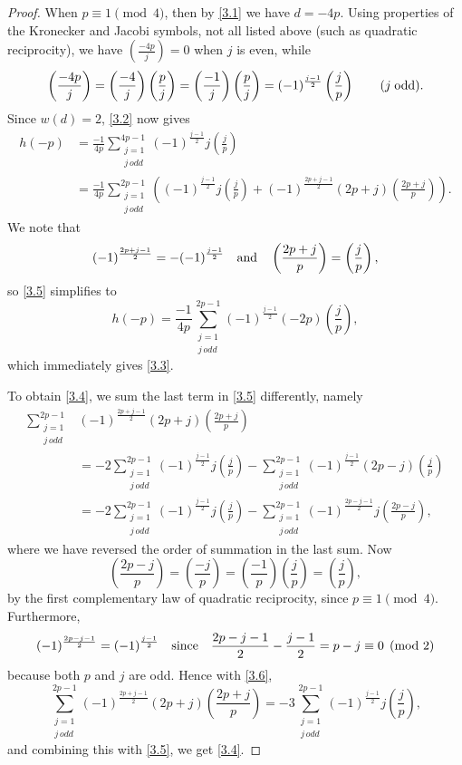 \documentclass{amsart}
\theoremstyle{plain}
\numberwithin{equation}{section}
\begin{document}
\begin{proof}
When $p\equiv 1\pmod{4}$, then by \eqref{3.1} we have $d=-4p$. Using 
properties of the Kronecker and Jacobi symbols, not all listed above (such as
quadratic reciprocity), we have $(\frac{-4p}{j})=0$ when $j$ is even, while
\[
\left(\frac{-4p}{j}\right)=\left(\frac{-4}{j}\right)\left(\frac{p}{j}\right)
=\left(\frac{-1}{j}\right)\left(\frac{p}{j}\right)
=(-1)^{\frac{j-1}{2}}\left(\frac{j}{p}\right)\qquad (j\;\hbox{odd}).
\]
Since $w(d)=2$, \eqref{3.2} now gives
\begin{align}
h(-p)&=\frac{-1}{4p}\sum_{\substack{j=1\\j\,odd}}^{4p-1}
(-1)^{\frac{j-1}{2}}j\left(\frac{j}{p}\right)\label{3.5} \\
&=\frac{-1}{4p}\sum_{\substack{j=1\\j\,odd}}^{2p-1}
\left((-1)^{\frac{j-1}{2}}j\left(\frac{j}{p}\right)
+(-1)^{\frac{2p+j-1}{2}}(2p+j)\left(\frac{2p+j}{p}\right)\right).\nonumber
\end{align}
We note that
\[
(-1)^{\frac{2p+j-1}{2}} = - (-1)^{\frac{j-1}{2}}\quad\hbox{and}\quad
\left(\frac{2p+j}{p}\right) = \left(\frac{j}{p}\right),
\]
so \eqref{3.5} simplifies to
\[
h(-p)=\frac{-1}{4p}\sum_{\substack{j=1\\j\,odd}}^{2p-1}
(-1)^{\frac{j-1}{2}}(-2p)\left(\frac{j}{p}\right),
\]
which immediately gives \eqref{3.3}.

To obtain \eqref{3.4}, we sum the last term in \eqref{3.5} differently, namely
\begin{align}
\sum_{\substack{j=1\\j\,odd}}^{2p-1}
&(-1)^{\frac{2p+j-1}{2}}(2p+j)\left(\frac{2p+j}{p}\right)\label{3.6}\\
&=-2\sum_{\substack{j=1\\j\,odd}}^{2p-1}
(-1)^{\frac{j-1}{2}}j\left(\frac{j}{p}\right)
-\sum_{\substack{j=1\\j\,odd}}^{2p-1}
(-1)^{\frac{j-1}{2}}(2p-j)\left(\frac{j}{p}\right) \nonumber\\
&=-2\sum_{\substack{j=1\\j\,odd}}^{2p-1}
(-1)^{\frac{j-1}{2}}j\left(\frac{j}{p}\right)
-\sum_{\substack{j=1\\j\,odd}}^{2p-1}
(-1)^{\frac{2p-j-1}{2}}j\left(\frac{2p-j}{p}\right),\nonumber
\end{align}
where we have reversed the order of summation in the last sum. Now
\[
\left(\frac{2p-j}{p}\right) = \left(\frac{-j}{p}\right)
= \left(\frac{-1}{p}\right)\left(\frac{j}{p}\right)
= \left(\frac{j}{p}\right),
\]
by the first complementary law of quadratic reciprocity, since 
$p\equiv 1\pmod{4}$. Furthermore,
\[
(-1)^{\frac{2p-j-1}{2}} = (-1)^{\frac{j-1}{2}}\quad\hbox{since}\quad
\frac{2p-j-1}{2}-\frac{j-1}{2}=p-j\equiv 0\pmod{2}
\]
because both $p$ and $j$ are odd. Hence with \eqref{3.6},
\[
\sum_{\substack{j=1\\j\,odd}}^{2p-1}
(-1)^{\frac{2p+j-1}{2}}(2p+j)\left(\frac{2p+j}{p}\right)
=-3\sum_{\substack{j=1\\j\,odd}}^{2p-1}
(-1)^{\frac{j-1}{2}}j\left(\frac{j}{p}\right),
\]
and combining this with \eqref{3.5}, we get \eqref{3.4}.
\end{proof}
\end{document}
